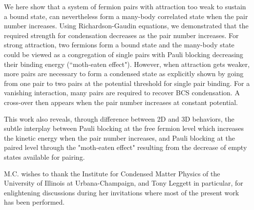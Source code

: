 \documentclass[5p,twocolumn]{elsarticle}
\begin{document}
We here show that a system of fermion pairs with attraction too weak to sustain a bound state, can nevertheless form a many-body correlated state when the pair number increases.  Using Richardson-Gaudin equations, we demonstrated that the required strength for condensation decreases as the pair number increases.  For strong attraction, two fermions form a bound state and the many-body state could be viewed as a congregation of single pairs with Pauli blocking decreasing their binding energy (``moth-eaten effect").  However, when attraction gets weaker, more pairs are necessary to form a condensed state as explicitly shown by going from one pair to two pairs at the potential threshold for single pair binding.  For a vanishing interaction, many pairs are required to recover BCS condensation.   A cross-over then appears when the pair number increases at constant potential.

 This work also reveals, through difference between 2D and 3D behaviors, the subtle interplay between Pauli blocking at the free fermion level which increases the kinetic energy when the pair number increases, and Pauli blocking at the paired level through the "moth-eaten effect" resulting from the decrease of empty states available for pairing.

M.C. wishes to thank the Institute for Condensed Matter Physics of the University of Illinois at
Urbana-Champaign, and Tony Leggett in particular, for enlightening discussions during her invitations  where most of the present work has been
performed. 
 



\end{document}
